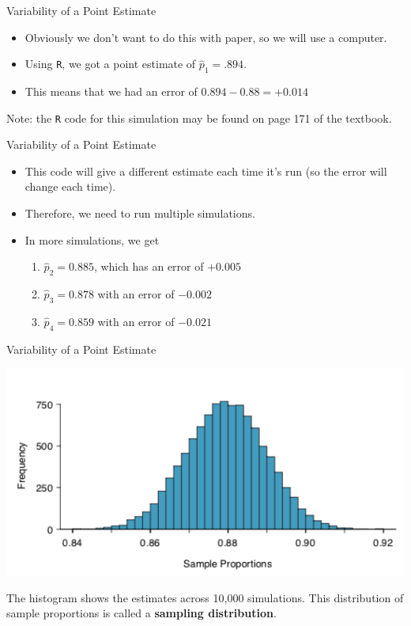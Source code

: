 \begin{frame}{Variability of a Point Estimate}
    \begin{itemize}
        \item Obviously we don't want to do this with paper, so we will use a computer.
        \item Using \texttt{R}, we got a point estimate of $\hat{p}_1=.894$.
        \item This means that we had an error of $0.894 − 0.88 = +0.014$
    \end{itemize}
    Note: the \texttt{R} code for this simulation may be found on page 171 of the textbook. 
\end{frame}

\begin{frame}{Variability of a Point Estimate}
    \begin{itemize}
        \item This code will give a different estimate each time it's run (so the error will change each time).
        \item Therefore, we need to run multiple simulations.
        \item In more simulations, we get
        \begin{enumerate}
            \item $\hat{p}_2 = 0.885$, which has an error of $+0.005$
            \item $\hat{p}_3 = 0.878$ with an error of $-0.002$
            \item $\hat{p}_4 = 0.859$ with an error of $-0.021$
        \end{enumerate}
    \end{itemize}
\end{frame}

\begin{frame}{Variability of a Point Estimate}
    \begin{center}
        \includegraphics[scale=0.5]{images/samplingdist.png}
    \end{center}
    \vspace{-10pt}The histogram shows the estimates across 10,000 simulations. This distribution of sample proportions is called a \textbf{sampling distribution}.
\end{frame}

